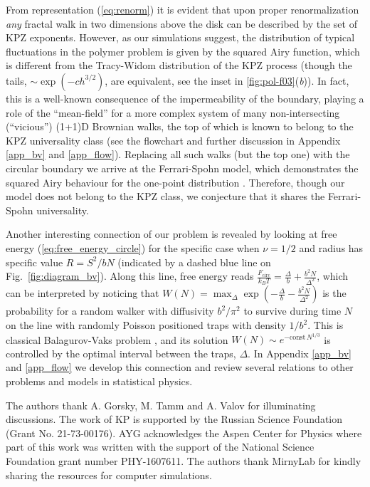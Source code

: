 \documentclass[aps,pre,floatfix,twocolumn,nofootinbib]{revtex4-2}
\newcommand{\eq}[1]{(\ref{#1})}
\newcommand{\fig}[1]{Fig.~\ref{#1}}
\begin{document}
From representation \eq{eq:renorm} it is evident that upon proper renormalization \textit{any} fractal walk in two dimensions above the disk can be described by the set of KPZ exponents.  However, as our simulations suggest, the distribution of typical fluctuations in the polymer problem is given by the squared Airy function, which is different from the Tracy-Widom distribution of the KPZ process (though the tails, $\sim \exp(-ch^{3/2})$, are equivalent, see the inset in \ref{fig:pol-f03}(\textit{b})). In fact, this is a well-known consequence of the impermeability of the boundary, playing a role of the ``mean-field'' for a more complex system of many non-intersecting (``vicious'') (1+1)D Brownian walks, the top of which is known to belong to the KPZ universality class (see the flowchart and further discussion in Appendix \ref{app_bv} and \ref{app_flow}). Replacing all such walks (but the top one) with the circular boundary we arrive at the Ferrari-Spohn model, which demonstrates the squared Airy behaviour for the one-point distribution \cite{spohn_ferrari,Baruch2}. Therefore, though our model does not belong to the KPZ class, we conjecture that it shares the Ferrari-Spohn universality.

Another interesting connection of our problem is revealed by looking at free energy (\ref{eq:free_energy_circle}) for the specific case when $\nu = 1/2$ and radius has specific value $R = S^2/b N$ (indicated by a dashed blue line on \fig{fig:diagram_bv}).  Along this line, free energy reads $\frac{F_{\mathrm{circ}}}{k_BT} = \frac{\Delta}{b} + \frac{b^2 N}{\Delta^2}$, which can be interpreted by noticing that $W(N) = \max_{\Delta} \exp \left( -\frac{\Delta}{b} - \frac{b^2 N}{\Delta^2} \right)$ is the probability for a random walker with diffusivity $b^2/\pi^2$ to survive during time $N$ on the line with randomly Poisson positioned traps with density $1/b^2$.  This is classical Balagurov-Vaks problem \cite{balagurov}, and its solution $W(N) \sim e^{ - \mathrm{const} \, N^{1/3}}$ is controlled by the optimal interval between the traps, $\Delta$.  In Appendix \ref{app_bv} and \ref{app_flow} we develop this connection and review several relations to other problems and models in statistical physics.



\begin{acknowledgements}


The authors thank A. Gorsky, M. Tamm and A. Valov for illuminating discussions. The work of KP is supported by the Russian Science Foundation (Grant No. 21-73-00176). AYG acknowledges the Aspen Center for Physics where part of this work was written with the support of the National Science Foundation grant number PHY-1607611. The authors thank MirnyLab for kindly sharing the resources for computer simulations.

\end{acknowledgements}
\end{document}
